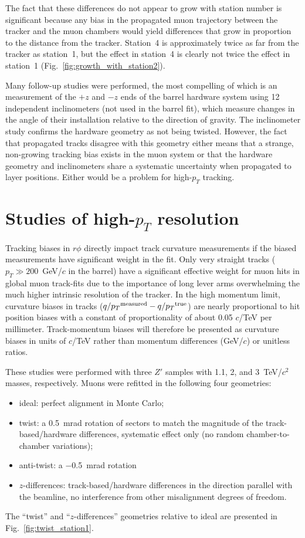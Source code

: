 \documentclass[12pt]{article}
\newcommand{\s}[1]{{\mbox{\scriptsize #1}}}
\begin{document}
The fact that these differences do not appear to grow with station
number is significant because any bias in the propagated muon
trajectory between the tracker and the muon chambers would yield
differences that grow in proportion to the distance from the tracker.
Station~4 is approximately twice as far from the tracker as station~1,
but the effect in station~4 is clearly not twice the effect in
station~1 (Fig.~\ref{fig:growth_with_station2}).

Many follow-up studies were performed, the most compelling of which is
an measurement of the $+z$ and $-z$ ends of the barrel hardware system
using 12 independent inclinometers (not used in the barrel fit), which
measure changes in the angle of their installation relative to the
direction of gravity.  The inclinometer study confirms the hardware
geometry as not being twisted.  However, the fact that propagated
tracks disagree with this geometry either means that a strange,
non-growing tracking bias exists in the muon system or that the
hardware geometry and inclinometers share a systematic uncertainty
when propagated to layer positions.  Either would be a problem for
high-$p_T$ tracking.

\section{Studies of high-$p_T$ resolution}

Tracking biases in $r\phi$ directly impact track curvature
measurements if the biased measurements have significant weight in the
fit.  Only very straight tracks ($p_T \gg 200$~GeV/$c$ in the barrel)
have a significant effective weight for muon hits in global muon
track-fits due to the importance of long lever arms overwhelming the
much higher intrinsic resolution of the tracker.  In the high momentum
limit, curvature biases in tracks ($q/{p_T}^\s{measured} -
q/{p_T}^\s{true}$) are nearly proportional to hit position biases with
a constant of proportionality of about 0.05 $c$/TeV per millimeter.
Track-momentum biases will therefore be presented as curvature biases
in units of $c$/TeV rather than momentum differences (GeV/$c$) or
unitless ratios.

These studies were performed with three $Z'$ samples with
1.1, 2, and 3~TeV/$c^2$ masses, respectively.  Muons were refitted in
the following four geometries:
\begin{itemize}
\item ideal: perfect alignment in Monte Carlo;
\item twist: a 0.5~mrad rotation of sectors to match the magnitude of
  the track-based/hardware differences, systematic effect only (no
  random chamber-to-chamber variations);
\item anti-twist: a $-$0.5~mrad rotation
\item $z$-differences: track-based/hardware differences in the direction
  parallel with the beamline, no interference from other misalignment
  degrees of freedom.
\end{itemize}
The ``twist'' and ``$z$-differences'' geometries relative to ideal are
presented in Fig.~\ref{fig:twist_station1}.
\end{document}
